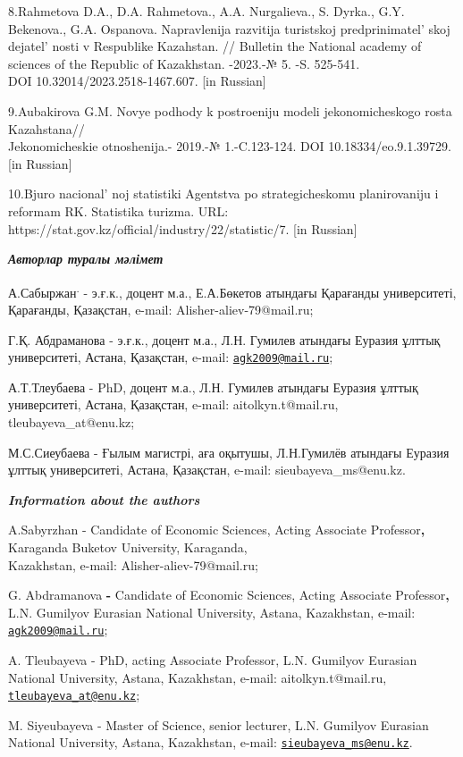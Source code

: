 \begin{references}
8.Rahmetova D.A., D.A. Rahmetova., A.A. Nurgalieva., S. Dyrka., G.Y.
Bekenova., G.A. Ospanova. Napravlenija razvitija turistskoj
predprinimatel' skoj dejatel' nosti v
Respublike Kazahstan. // Bulletin the National academy of sciences of
the Republic of Kazakhstan. -2023.-№ 5. -S. 525-541.\\ DOI
10.32014/2023.2518-1467.607. {[}in Russian{]}

9.Aubakirova G.M. Novye podhody k postroeniju modeli jekonomicheskogo
rosta Kazahstana//\\Jekonomicheskie otnoshenija.- 2019.-№ 1.-C.123-124.
DOI 10.18334/eo.9.1.39729. {[}in Russian{]}

10.Bjuro nacional' noj statistiki Agentstva po
strategicheskomu planirovaniju i reformam RK. Statistika turizma. URL:
{https://stat.gov.kz/official/industry/22/statistic/7}. {[}in
Russian{]}
\end{references}

\begin{authorinfo}
\hspace{1em}\emph{{\bfseries Авторлар туралы мәлімет}}

А.Сабыржан\textsuperscript{.} - э.ғ.к., доцент м.а., Е.А.Бөкетов
атындағы Қарағанды университеті, Қарағанды, Қазақстан, e-mail:
Alisher-aliev-79@mail.ru;

Г.Қ. Абдраманова - э.ғ.к., доцент м.а., Л.Н. Гумилев атындағы Еуразия
ұлттық университеті, Астана, Қазақстан, e-mail:
\href{mailto:agk2009@mail.ru}{\nolinkurl{agk2009@mail.ru}};

А.Т.Тлеубаева - PhD, доцент м.а., Л.Н. Гумилев атындағы Еуразия ұлттық
университеті, Астана, Қазақстан, e-mail: aitolkyn.t@mail.ru,
tleubayeva\_at@enu.kz;

М.С.Сиеубаева - Ғылым магистрі, аға оқытушы, Л.Н.Гумилёв атындағы
Еуразия ұлттық университеті, Астана, Қазақстан, e-mail:
sieubayeva\_ms@enu.kz.

\hspace{1em}\emph{{\bfseries Information about the authors}}

A.Sabyrzhan - Candidate of Economic Sciences, Acting Associate
Professor{\bfseries ,} Karaganda Buketov University, Karaganda, \\Kazakhstan,
e-mail: Alisher-aliev-79@mail.ru;

G. Abdramanova {\bfseries -} Candidate of Economic Sciences, Acting
Associate Professor{\bfseries ,} L.N. Gumilyov Eurasian National
University, Astana, Kazakhstan, e-mail:
\href{mailto:agk2009@mail.ru}{\nolinkurl{agk2009@mail.ru}};

A. Tleubayeva - PhD, acting Associate Professor, L.N. Gumilyov Eurasian
National University, Astana, Kazakhstan, e-mail: aitolkyn.t@mail.ru,
\href{mailto:tleubayeva_at@enu.kz}{\nolinkurl{tleubayeva\_at@enu.kz}};

M. Siyeubayeva - Master of Science, senior lecturer, L.N. Gumilyov
Eurasian National University, Astana, Kazakhstan, e-mail:
\href{mailto:sieubayeva_ms@enu.kz}{\nolinkurl{sieubayeva\_ms@enu.kz}}.
\end{authorinfo}
